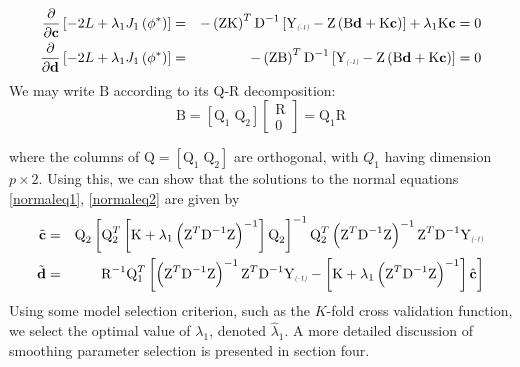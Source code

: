 \documentclass[12pt]{article}
\newcommand{\lmr}{\fontfamily{lmr}\selectfont} %
\newcommand{\bfd}{\mbox{\bf d}}
\newcommand{\bfc}{\mbox{\bf c}}
\newcommand{\bigY}{\mbox{Y}}
\newcommand{\matK}{\mbox{K}}
\newcommand{\matB}{\mbox{B}}
\newcommand{\matQ}{\mbox{Q}}
\newcommand{\matR}{\mbox{R}}
\newcommand{\matD}{\mbox{D}}
\newcommand{\matZ}{\mbox{Z}}
\begin{document}
\begin{eqnarray}
\frac{\partial}{\partial \bfc}\left[ -2\lmr{L} + \lambda_1 J_1\left(\phi^*\right)\right] &=& - \left(\matZ \matK \right)^T \matD^{-1}\left[\bigY_{\textsc{\relsize{-2}{\textsl{(-1)}}}} - \matZ \left(\matB \bfd + \matK \bfc \right) \right] + \lambda_1 \matK \bfc= 0 \label{eq:normaleq1}\\
\frac{\partial}{\partial \bfd}\left[ -2\lmr{L} + \lambda_1 J_1\left(\phi^*\right) \right]&=& - \left(\matZ \matB \right)^T \matD^{-1}\left[\bigY_{\textsc{\relsize{-2}{\textsl{(-1)}}}} - \matZ \left(\matB \bfd + \matK \bfc \right) \right] = 0 \label{eq:normaleq2}
\end{eqnarray}
\noindent
We may write $\matB$ according to its Q-R decomposition: 
\[
\matB  = \left[ \matQ_1 \; \matQ_2\right]\left[ \begin{array}{c} \matR \\ 0 \end{array}\right] = \matQ_1 \matR  
\]

\noindent
where the columns of $\text{Q}=\left[ \matQ_1 \; \matQ_2\right]$ are orthogonal, with $Q_1$ having dimension $p \times 2$. Using this, we can show that the solutions to the normal equations \eqref{normaleq1}, \eqref{normaleq2} are given by 
\begin{eqnarray*}
\tilde{\bfc} &=&  \matQ_2\left[ \matQ_2^T\left[\matK + \lambda_1\left( \matZ^T \matD^{-1} \matZ \right)^{-1}\right] \matQ_2 \right]^{-1} \matQ_2^T\left(\matZ^T \matD^{-1} \matZ \right)^{-1}\matZ^T \matD^{-1} \bigY_{\textsc{\relsize{-2}{\textsl{(-1)}}}}\\
\tilde{\bfd} &=& \matR^{-1}\matQ_1^T\left[ \left( \matZ^T \matD^{-1} \matZ \right)^{-1}\matZ^T \matD^{-1} \bigY_{\textsc{\relsize{-2}{\textsl{(-1)}}}} -  \left[\matK + \lambda_1\left( \matZ^T \matD^{-1} \matZ \right)^{-1}\right] \hat{\bfc} \right]
\end{eqnarray*}
\noindent
Using some model selection criterion, such as the $K$-fold cross validation function, we select the optimal value of $\lambda_1$, denoted $\hat{\lambda}_1$. A more detailed discussion of smoothing parameter selection is presented in section four.
%
\end{document}
